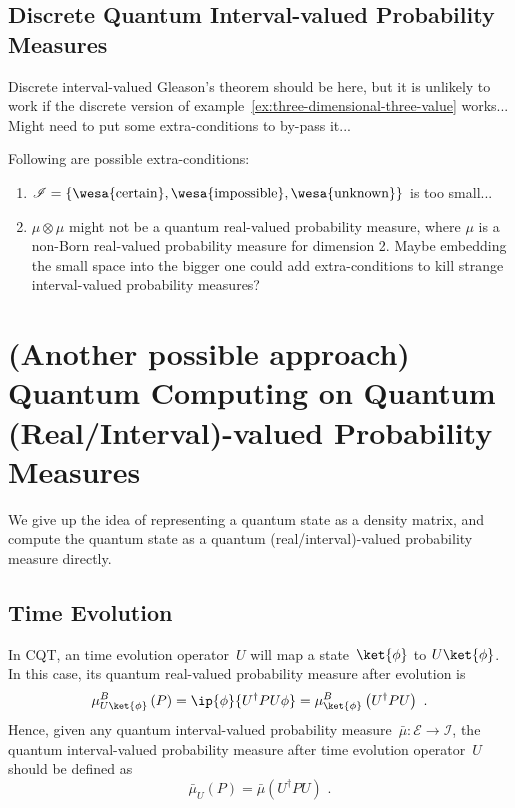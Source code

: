 \documentclass{article}
\theoremstyle{remark}
\newcommand{\events}{\ensuremath{\mathcal{E}}}
\newcommand{\imposs}{{\mbox{\wesa{impossible}}}}
\newcommand{\necess}{{\mbox{\wesa{certain}}}}
\newcommand{\unknown}{{\mbox{\wesa{unknown}}}}
\begin{document}
\subsection{Discrete Quantum Interval-valued Probability Measures}

Discrete interval-valued Gleason's theorem should be here, but it
is unlikely to work if the discrete version of example~\ref{ex:three-dimensional-three-value}
works... Might need to put some extra-conditions to by-pass it...

Following are possible extra-conditions:
\begin{enumerate}
\item \emph{$\mathscr{I}=\left\{ \necess,\imposs,\unknown\right\} $} is
too small...
\item $\mu\otimes\mu$ might not be a quantum real-valued probability measure,
where $\mu$ is a non-Born real-valued probability measure for dimension
2. Maybe embedding the small space into the bigger one could add extra-conditions
to kill strange interval-valued probability measures?
\end{enumerate}

\section{\label{sec:QC}(Another possible approach) Quantum Computing on Quantum
(Real/Interval)-valued Probability Measures}

We give up the idea of representing a quantum state as a density matrix,
and compute the quantum state as a quantum (real/interval)-valued
probability measure directly. 



\subsection{Time Evolution}

In CQT, an time evolution operator~$U$ will map a state~$\ket{\phi}$
to $U\ket{\phi}$. In this case, its quantum real-valued probability
measure after evolution is
\[
\mu_{U\ket{\phi}}^{B}\left(P\right)=\ip{\phi}{U^{\dagger}PU\phi}=\mu_{\ket{\phi}}^{B}\left(U^{\dagger}PU\right)\textrm{ .}
\]
Hence, given any quantum interval-valued probability measure~$\bar{\mu}:\events\rightarrow\mathscr{I}$,
the quantum interval-valued probability measure after time evolution
operator~$U$ should be defined as 
\[
\bar{\mu}_{U}\left(P\right)=\bar{\mu}\left(U^{\dagger}PU\right)\textrm{ .}
\]
\end{document}
